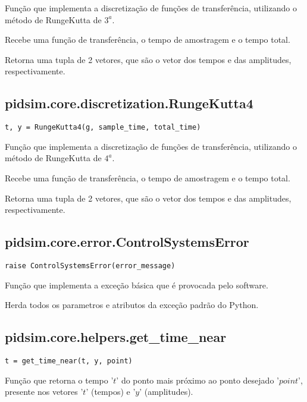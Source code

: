     Função que implementa a discretização de funções de transferência,
    utilizando o método de RungeKutta de $3^a$.
    
    Recebe uma função de transferência, o tempo de amostragem e o tempo
    total.
    
    Retorna uma tupla de 2 vetores, que são o vetor dos tempos e das amplitudes,
    respectivamente.

\subsection{pidsim.core.discretization.RungeKutta4}

    \begin{verbatim}
t, y = RungeKutta4(g, sample_time, total_time)\end{verbatim}
    
    Função que implementa a discretização de funções de transferência,
    utilizando o método de RungeKutta de $4^a$.
    
    Recebe uma função de transferência, o tempo de amostragem e o tempo
    total.
    
    Retorna uma tupla de 2 vetores, que são o vetor dos tempos e das amplitudes,
    respectivamente.

\subsection{pidsim.core.error.ControlSystemsError}

    \begin{verbatim}
raise ControlSystemsError(error_message)\end{verbatim}
    
    Função que implementa a exceção básica que é provocada pelo software.
    
    Herda todos os parametros e atributos da exceção padrão do Python.

\subsection{pidsim.core.helpers.get\_time\_near}

    \begin{verbatim}
t = get_time_near(t, y, point)\end{verbatim}
    
    Função que retorna o tempo '$t$' do ponto mais próximo ao ponto
    desejado '$point$', presente nos vetores '$t$' (tempos) e '$y$'
    (amplitudes).
    
